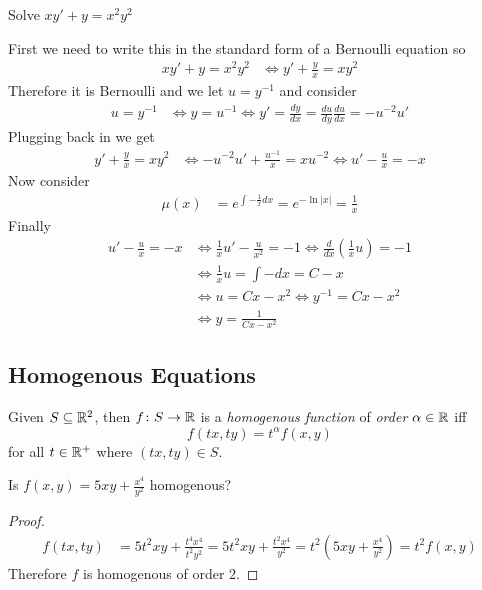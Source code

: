 \documentclass[notes]{subfiles}
\begin{document}
\begin{exercise}
    Solve $xy' + y = x^2y^2$
\end{exercise}
\begin{solution}
    First we need to write this in the standard form of a Bernoulli equation so
    \begin{align*}
        xy' + y = x^2y^2
        &\iff y' + \frac{y}{x} = xy^2
    \end{align*}
    Therefore it is Bernoulli and we let $u = y^{-1}$ and consider 
    \begin{align*}
        u = y^{-1}
        &\iff y = u^{-1}
        \iff y' = \frac{dy}{dx} = \frac{du}{dy}\frac{du}{dx} = -u^{-2}u'
    \end{align*}
    Plugging back in we get
    \begin{align*}
        y' + \frac{y}{x} = xy^2
        &\iff -u^{-2}u' + \frac{u^{-1}}{x} = xu^{-2}
        \iff u' - \frac{u}{x} = -x
    \end{align*}
    Now consider
    \begin{align*}
        \mu(x)
        &= e^{\int -\frac{1}{x} dx}
        = e^{-\ln|x|}
        = \frac{1}{x}
    \end{align*}
    Finally
    \begin{align*}
        u' - \frac{u}{x} = -x
        &\iff \frac{1}{x}u' - \frac{u}{x^2} = -1
        \iff \frac{d}{dx}\left( \frac{1}{x}u \right) = -1 \\
        &\iff \frac{1}{x}u = \int -dx = C - x \\
        &\iff u = Cx - x^2
        \iff y^{-1} = Cx - x^2 \\
        &\iff y = \frac{1}{Cx - x^2}
    \end{align*}
\end{solution}

\subsection{Homogenous Equations}

\begin{definition}
    Given $S \subseteq \mathbb{R}^2$, then $f\colon S \to \mathbb{R}$ is a \textsl{homogenous function} of \textsl{order} $\alpha \in \mathbb{R}$ iff
    \[
        f(tx, ty) = t^\alpha f(x, y)
    \]
    for all $t \in \mathbb{R}^+$ where $(tx, ty) \in S$.
\end{definition}

\begin{exercise}
    Is $f(x, y) = 5xy + \frac{x^4}{y^2}$ homogenous?
\end{exercise}
\begin{proof}
    \begin{align*}
        f(tx, ty)
        &= 5t^2xy + \frac{t^4x^4}{t^2y^2}
        = 5t^2xy + \frac{t^2x^4}{y^2}
        = t^2\left( 5xy + \frac{x^4}{y^2} \right)
        = t^2 f(x, y)
    \end{align*}
    Therefore $f$ is homogenous of order $2$.
\end{proof}
\end{document}
